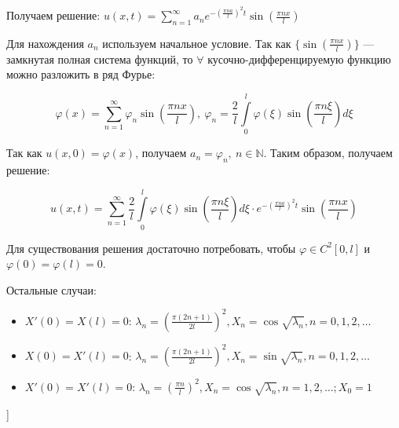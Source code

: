 \bigbreak
Получаем решение: $u(x,t)=\displaystyle\sum_{n=1}^{\infty} a_n e^{-(\frac{\pi n a}{l})^2t} \sin(\frac{\pi n x}{l})$

Для нахождения $a_n$ используем начальное условие.
Так как $\{\sin(\frac{\pi n x}{l})\}$ --- замкнутая полная система функций, то $\forall$ кусочно-дифференцируемую функцию можно разложить в ряд Фурье:

$$\varphi(x) = \displaystyle\sum_{n=1}^{\infty} \varphi_n \sin(\frac{\pi n x}{l}),~\varphi_n=\frac{2}{l}\int\limits_0^l\varphi(\xi)\sin(\frac{\pi n \xi}{l})d\xi$$

Так как $u(x,0) = \varphi(x)$, получаем $a_n = \varphi_n,~n\in\mathbb{N}$. Таким образом, получаем решение:

$$u(x,t)=
\displaystyle\sum_{n=1}^{\infty} \frac{2}{l}\int\limits_0^l\varphi(\xi)\sin \left( \frac{\pi n \xi}{l} \right)d\xi \cdot e^{-(\frac{\pi n a}{l})^2t} \sin \left(\frac{\pi n x}{l} \right)$$

\bigbreak
Для существования решения достаточно потребовать, чтобы $\varphi\in C^2[0,l]$ и $\varphi(0)=\varphi(l)=0$.

\bigbreak
Остальные случаи:
\begin{itemize}
    \item $X'(0)=X(l)=0$: $\lambda_n=\left(\frac{\pi(2n+1)}{2l}\right)^2, X_n=\cos\sqrt{\lambda_n}, n=0,1,2,\dots$ \\
    \item $X(0)=X'(l)=0$: $\lambda_n=\left(\frac{\pi(2n+1)}{2l}\right)^2, X_n=\sin\sqrt{\lambda_n}, n=0,1,2,\dots$ \\
    \item $X'(0)=X'(l)=0$: $\lambda_n=\left(\frac{\pi n}{l}\right)^2, X_n=\cos\sqrt{\lambda_n}, n=1,2,\dots; X_0=1$ \\
\end{itemize}

\bigbreak
[\cite[page 200-202]{urmati_tikhonov}]